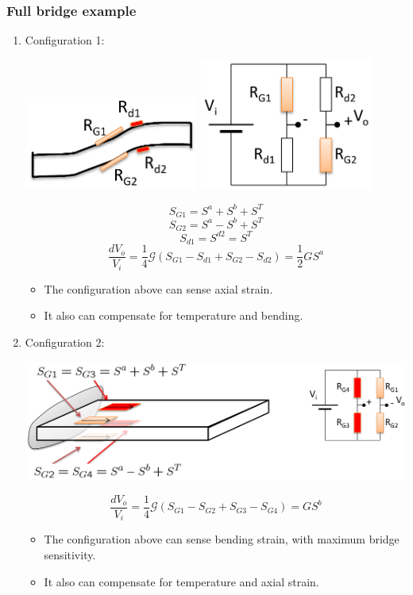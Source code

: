 \documentclass[11pt]{article}
\begin{document}
\subsubsection{Full bridge example}
\label{sec:orgbb9d1e6}
\begin{enumerate}
\item Configuration 1:
\begin{center}
\includegraphics[width=0.45\textwidth]{./images/apparent-strain-full-bridge-configuration-1-diagram.png}
\includegraphics[width=0.45\textwidth]{./images/apparent-strain-full-bridge-configuration-1-circuit-diagram.png}
\end{center}

\[S_{G1} = S^a + S^b + S^T\]
\[S_{G2} = S^a - S^b + S^T\]
\[S_{d1} = S^{d2} = S^T\]
\[\frac{dV_o}{V_i} = \frac{1}{4} \mathcal{G} (S_{G1} - S_{d1} + S_{G2} - S_{d2}) = \frac{1}{2} G S^a\]

\begin{itemize}
\item The configuration above can sense axial strain.
\item It also can compensate for temperature and bending.
\end{itemize}

\item Configuration 2:
\begin{center}
\includegraphics[width=.9\linewidth]{./images/apparent-strain-full-bridge-configuration-2-diagram.png}
\end{center}

\[\frac{dV_o}{V_i} = \frac{1}{4} \mathcal{G} (S_{G1} - S_{G2} + S_{G3} - S_{G4}) = G S^b\]

\begin{itemize}
\item The configuration above can sense bending strain, with maximum bridge sensitivity.
\item It also can compensate for temperature and axial strain.
\end{itemize}
\end{enumerate}
\end{document}
